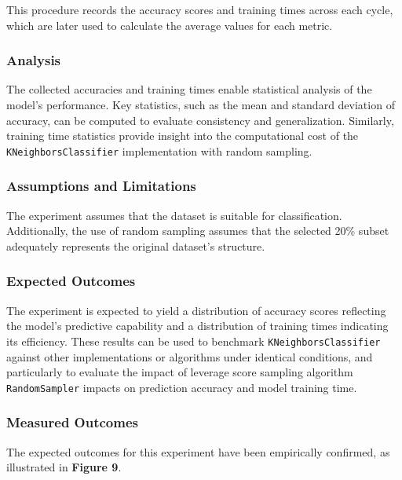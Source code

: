 \documentclass{article}
\theoremstyle{plain}
\theoremstyle{definition}
\theoremstyle{remark}
\begin{document}
This procedure records the accuracy scores and training times across each cycle, which are later used to calculate the average values for each metric.

\subsubsection{Analysis}

The collected accuracies and training times enable statistical analysis of the model's performance. Key statistics, such as the mean and standard deviation of accuracy, can be computed to evaluate consistency and generalization. Similarly, training time statistics provide insight into the computational cost of the \texttt{KNeighborsClassifier} implementation with random sampling.

\subsubsection{Assumptions and Limitations}

The experiment assumes that the dataset is suitable for classification. Additionally, the use of random sampling assumes that the selected 20\% subset adequately represents the original dataset's structure.

\subsubsection{Expected Outcomes}

The experiment is expected to yield a distribution of accuracy scores reflecting the model's predictive capability and a distribution of training times indicating its efficiency. These results can be used to benchmark \texttt{KNeighborsClassifier} against other implementations or algorithms under identical conditions, and particularly to evaluate the impact of leverage score sampling algorithm \texttt{RandomSampler} impacts on prediction accuracy and model training time.

\subsubsection{Measured Outcomes}

The expected outcomes for this experiment have been empirically confirmed, as illustrated in \textbf{Figure 9}.
\end{document}
